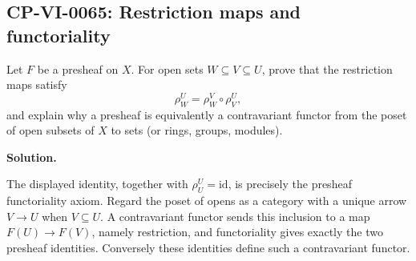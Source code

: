 
\subsection*{CP-VI-0065: Restriction maps and functoriality}

Let $F$ be a presheaf on $X$. For open sets $W\subseteq V\subseteq U$, prove that the restriction maps satisfy
\[
\rho^U_W=\rho^V_W\circ\rho^U_V,
\]
and explain why a presheaf is equivalently a contravariant functor from the poset of open subsets of $X$ to sets (or rings, groups, modules).

\medskip
\noindent\textbf{Solution.}

The displayed identity, together with $\rho^U_U=\mathrm{id}$, is precisely the presheaf functoriality axiom. Regard the poset of opens as a category with a unique arrow $V\to U$ when $V\subseteq U$. A contravariant functor sends this inclusion to a map $F(U)\to F(V)$, namely restriction, and functoriality gives exactly the two presheaf identities. Conversely these identities define such a contravariant functor.
